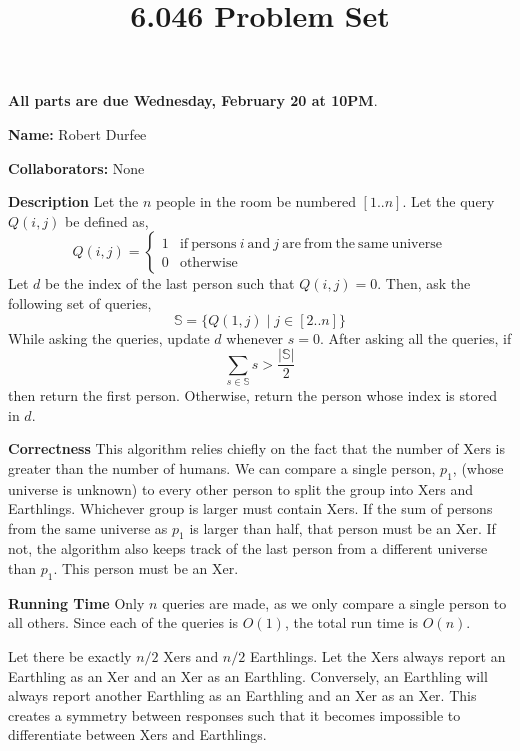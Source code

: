 \documentclass[12pt,twoside]{article}
\title{6.046 Problem Set \theproblemsetnum}
\newcommand{\theproblemsetnum}{2}
\newcommand{\releasedate}{Thursday, February 14}
\newcommand{\partaduedate}{Wednesday, February 20}
\begin{document}
\handout{Problem Set \theproblemsetnum}{\releasedate}
\textbf{All parts are due {\bf \partaduedate} at {\bf 10PM}}.

\setlength{\parindent}{0pt}
\medskip\hrulefill\medskip

{\bf Name:} Robert Durfee

\medskip

{\bf Collaborators:} None

\medskip\hrulefill

\begin{problems}

\problem  %

\begin{problemparts}

\problempart %

\textbf{Description} Let the $n$ people in the room be numbered $[1..n]$. 
Let the query $Q(i, j)$ be defined as,
$$ Q(i, j) = \begin{cases}
    1 & \mathrm{if\ persons}\ i\ \mathrm{and}\ j \ \mathrm{are\ from\ the\ same\
    universe} \\
    0 & \mathrm{otherwise}
\end{cases} $$
Let $d$ be the index of the last person such that $Q(i, j) = 0$. Then, ask the 
following set of queries,
$$ \mathbb{S} = \{ Q(1, j) \mid j \in [2..n] \} $$
While asking the queries, update $d$ whenever $s = 0$. After asking all the 
queries, if
$$ \sum_{s \in \mathbb{S}} s > \frac{\vert \mathbb{S} \vert}{2} $$
then return the first person. Otherwise, return the person whose index is stored
in $d$.

\textbf{Correctness} This algorithm relies chiefly on the fact that the number
of Xers is greater than the number of humans. We can compare a single person,
$p_1$, (whose universe is unknown) to every other person to split the group 
into Xers and Earthlings. Whichever group is larger must contain Xers. If the
sum of persons from the same universe as $p_1$ is larger than half, that person
must be an Xer. If not, the algorithm also keeps track of the last person from
a different universe than $p_1$. This person must be an Xer.

\textbf{Running Time} Only $n$ queries are made, as we only compare a single
person to all others. Since each of the queries is $O(1)$, the total run time is
$O(n)$.

\problempart %

Let there be exactly $n/2$ Xers and $n/2$ Earthlings. Let the Xers always report
an Earthling as an Xer and an Xer as an Earthling. Conversely, an Earthling will
always report another Earthling as an Earthling and an Xer as an Xer. This 
creates a symmetry between responses such that it becomes impossible to
differentiate between Xers and Earthlings.


\end{problemparts}
\end{problems}
\end{document}
